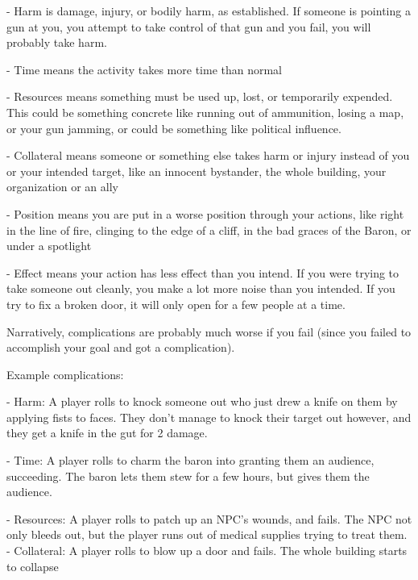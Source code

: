     -    Harm is damage, injury, or bodily harm, as established. If someone is pointing a gun at  
         you, you attempt to take control of that gun and you fail, you will probably take harm.
 

                                                                                                                  


     -   Time means the activity takes more time than normal
 
     -   Resources means something must be used up, lost, or temporarily expended. This could  
         be something concrete like running out of ammunition, losing a map, or your gun  
         jamming, or could be something like political influence.
 
     -   Collateral means someone or something else takes harm or injury instead of you or your  
         intended target, like an innocent bystander, the whole building, your organization or an  
         ally
 
     -   Position means you are put in a worse position through your actions, like right in the line  
         of fire, clinging to the edge of a cliff, in the bad graces of the Baron, or under a spotlight
 
     -   Effect means your action has less effect than you intend. If you were trying to take  
         someone out cleanly, you make a lot more noise than you intended. If you try to fix a  
         broken door, it will only open for a few people at a time.
 

Narratively, complications are probably much worse if you fail (since you failed to accomplish  
your goal and got a complication).
 

Example complications:
 
         	- Harm: A player rolls to knock someone out who just drew a knife on them by applying  
         fists to faces. They don’t manage to knock their target out however, and they get a knife  
         in the gut for 2 damage.
 
         - Time: A player rolls to charm the baron into granting them an audience, succeeding.  
         The baron lets them stew for a few hours, but gives them the audience.
 
         	- Resources: A player rolls to patch up an NPC’s wounds, and fails. The NPC not only  
         bleeds out, but the player runs out of medical supplies trying to treat them.  
         - Collateral: A player rolls to blow up a door and fails. The whole building starts to  
         collapse
 

